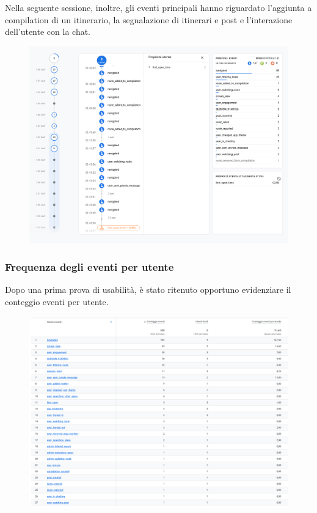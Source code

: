 \documentclass{natourDoc}
\begin{document}
Nella seguente sessione, inoltre, gli eventi principali hanno riguardato l'aggiunta a compilation di 
un itinerario, la segnalazione di itinerari e post e l'interazione dell'utente con la chat.
\begin{figure}[!htbp]
	\centering
	\includegraphics[width=\textwidth]{./analytics/debug-emu2.png}
\end{figure}
\FloatBarrier

\newpage

\subsubsection{Frequenza degli eventi per utente}
Dopo una prima prova di usabilità, è stato ritenuto opportuno evidenziare il conteggio eventi per utente.

\begin{figure}[!htbp]
	\centering
	\includegraphics[width=\textwidth]{./analytics/eventi-totali.png}
\end{figure}
\FloatBarrier
\end{document}
